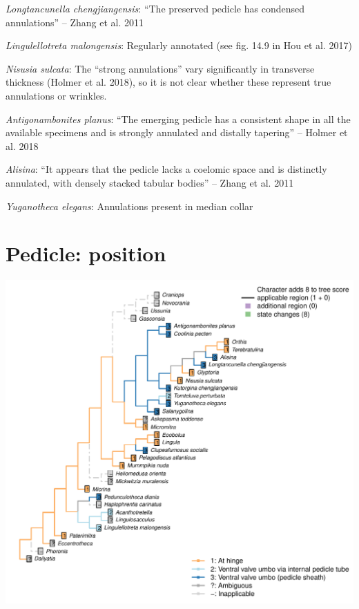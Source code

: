 \documentclass[]{book}
\theoremstyle{definition}
\theoremstyle{definition}
\theoremstyle{definition}
\theoremstyle{remark}
\begin{document}
\emph{Longtancunella chengjiangensis}: ``The preserved pedicle has
condensed annulations'' -- Zhang et al. 2011

\emph{Lingulellotreta malongensis}: Regularly annotated (see fig. 14.9
in Hou et al. 2017)

\emph{Nisusia sulcata}: The ``strong annulations'' vary significantly in
transverse thickness (Holmer et al. 2018), so it is not clear whether
these represent true annulations or wrinkles.

\emph{Antigonambonites planus}: ``The emerging pedicle has a consistent
shape in all the available specimens and is strongly annulated and
distally tapering'' -- Holmer et al. 2018

\emph{Alisina}: ``It appears that the pedicle lacks a coelomic space and
is distinctly annulated, with densely stacked tabular bodies'' -- Zhang
et al. 2011

\emph{Yuganotheca elegans}: Annulations present in median collar

\hypertarget{pedicle-position}{%
\section*{Pedicle: position}\label{pedicle-position}}

\includegraphics{Brachiopod_phylogeny_files/figure-latex/unnamed-chunk-5-79.pdf}
\end{document}
